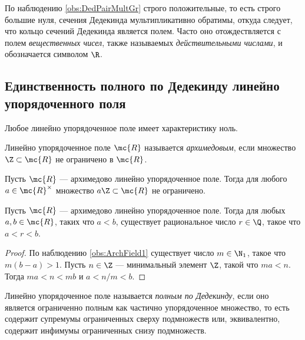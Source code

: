 \documentclass[
	extrafontsizes,
	11pt,
	hyphens,
]{memoir}
\begin{document}
\begin{observation}
По наблюдению \ref{obs:DedPairMultGr} строго положительные, то есть строго большие нуля, сечения Дедекинда мультипликативно обратимы, откуда следует, что кольцо сечений Дедекинда является полем.
Часто оно отождествляется с полем \emph{вещественных чисел}, также называемых \emph{действительными числами}, и обозначается символом \(\R\).
\end{observation}

\subsection{Единственность полного по Дедекинду линейно упорядоченного поля}

\begin{observation}
Любое линейно упорядоченное поле имеет характеристику ноль.
\end{observation}

\begin{definition}[\scshape Архимедово поле]
Линейно упорядоченное поле \(\mc{R}\) называется \emph{архимедовым}, если множество \(\Z \subset \mc{R}\) не ограничено в \(\mc{R}\).
\end{definition}

\begin{observation}
\label{obs:ArchField1}
Пусть \(\mc{R}\) --- архимедово линейно упорядоченное поле.
Тогда для любого \(a \in \mc{R}^\times\) множество \(a \Z \subset \mc{R}\) не ограничено.
\end{observation}

\begin{theorem}
\label{thm:ArchFieldDens}
Пусть \(\mc{R}\) --- архимедово линейно упорядоченное поле.
Тогда для любых \(a, b \in \mc{R}\), таких что \(a < b\), существует рациональное число \(r \in \Q\), такое что \(a < r < b\).
\end{theorem}

\begin{proof}
По наблюдению \ref{obs:ArchField1} существует число \(m \in \N_1\), такое что \(m(b-a) > 1\). Пусть \(n \in \Z\) --- минимальный элемент \(\Z\), такой что \(ma < n\). Тогда \(ma < n < mb\) и \(a < n/m < b\).
\end{proof}

\begin{definition}
Линейно упорядоченное поле называется \emph{полным по Дедекинду}, если оно является ограниченно полным как частично упорядоченное множество, то есть содержит
супремумы ограниченных сверху подмножеств или, эквивалентно, содержит инфимумы ограниченных снизу подмножеств.
\end{definition}
\end{document}
